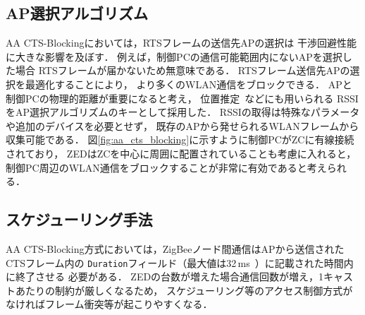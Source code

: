 \documentclass[technicalreport]{ieicej}
\begin{document}
\subsection{AP選択アルゴリズム}
\label{ssec:select_ap}

AA CTS-Blockingにおいては，RTSフレームの送信先APの選択は
干渉回避性能に大きな影響を及ぼす．
例えば，制御PCの通信可能範囲内にないAPを選択した場合
RTSフレームが届かないため無意味である．
RTSフレーム送信先APの選択を最適化することにより，
より多くのWLAN通信をブロックできる．
APと制御PCの物理的距離が重要になると考え，
位置推定~\cite{izumi13:}などにも用いられる
RSSIをAP選択アルゴリズムのキーとして採用した．
RSSIの取得は特殊なパラメータや追加のデバイスを必要とせず，
既存のAPから発せられるWLANフレームから収集可能である．
図\ref{fig:aa_cts_blocking}に示すように制御PCがZCに有線接続されており，
ZEDはZCを中心に周囲に配置されていることも考慮に入れると，
制御PC周辺のWLAN通信をブロックすることが非常に有効であると考えられる．

\subsection{スケジューリング手法}
\label{ssec:design}

AA CTS-Blocking方式においては，ZigBeeノード間通信はAPから送信されたCTSフレーム内の
\texttt{Duration}フィールド（最大値は32\,ms~\cite{Bellardo09:}）に記載された時間内に終了させる
必要がある．
ZEDの台数が増えた場合通信回数が増え，1キャストあたりの制約が厳しくなるため，
スケジューリング等のアクセス制御方式がなければフレーム衝突等が起こりやすくなる．
\end{document}
